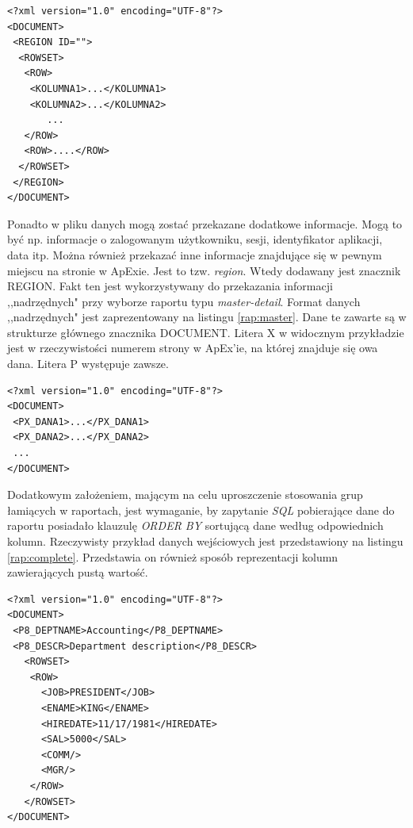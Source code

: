 \documentclass[11pt,a4paper]{article}
\begin{document}
\lstset{language=XML}
\begin{lstlisting}[frame=single,caption=Ogólna postać dokumentu XML z danymi pochodzącymi z ApExa,label=rap:apex]
<?xml version="1.0" encoding="UTF-8"?>
<DOCUMENT>
 <REGION ID="">
  <ROWSET>
   <ROW>
    <KOLUMNA1>...</KOLUMNA1>
    <KOLUMNA2>...</KOLUMNA2>
       ...	
   </ROW>
   <ROW>....</ROW>
  </ROWSET>
 </REGION>
</DOCUMENT>
\end{lstlisting}

Ponadto w pliku danych mogą zostać przekazane dodatkowe informacje. Mogą to być np. informacje o zalogowanym użytkowniku, sesji, identyfikator aplikacji, data itp. Można również przekazać inne informacje znajdujące się w pewnym miejscu na stronie w ApExie. Jest to tzw. \emph{region}. Wtedy dodawany jest znacznik REGION. Fakt ten jest wykorzystywany do przekazania informacji ,,nadrzędnych" przy wyborze raportu typu \emph{master-detail}. Format danych ,,nadrzędnych" jest zaprezentowany na listingu \ref{rap:master}. Dane te zawarte są w strukturze głównego znacznika DOCUMENT. Litera X w widocznym przykładzie jest w rzeczywistości numerem strony w ApEx'ie, na której znajduje się owa dana. Litera P występuje zawsze. 

\lstset{language=XML}
\begin{lstlisting}[frame=single,caption=Format danych typu \emph{master},label=rap:master]
<?xml version="1.0" encoding="UTF-8"?>
<DOCUMENT>
 <PX_DANA1>...</PX_DANA1>
 <PX_DANA2>...</PX_DANA2>
 ...
</DOCUMENT>
\end{lstlisting}

Dodatkowym założeniem, mającym na celu uproszczenie stosowania grup łamiących w raportach, jest wymaganie, by zapytanie \emph{SQL} pobierające dane do raportu posiadało klauzulę \emph{ORDER BY} sortującą dane według odpowiednich kolumn. Rzeczywisty przykład danych wejściowych jest przedstawiony na listingu \ref{rap:complete}. Przedstawia on również sposób reprezentacji kolumn zawierających pustą wartość. 

\lstset{language=XML}
\begin{lstlisting}[frame=single,caption=Przykładowe dane,label=rap:complete]
<?xml version="1.0" encoding="UTF-8"?>
<DOCUMENT>
 <P8_DEPTNAME>Accounting</P8_DEPTNAME>
 <P8_DESCR>Department description</P8_DESCR>
   <ROWSET>
    <ROW>
      <JOB>PRESIDENT</JOB>
      <ENAME>KING</ENAME>
      <HIREDATE>11/17/1981</HIREDATE>
      <SAL>5000</SAL>
      <COMM/>
      <MGR/>
    </ROW>
   </ROWSET>
</DOCUMENT>
\end{lstlisting}
\end{document}
